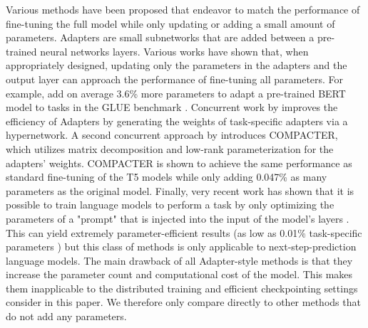Various methods have been proposed that endeavor to match the performance of fine-tuning the full model while only updating or adding a small amount of parameters. Adapters \citep{DBLP:journals/corr/abs-1902-00751,rebuffi2017learning,bapna2019simple} are small subnetworks that are added between a pre-trained neural networks layers. Various works \citep{DBLP:journals/corr/abs-1902-00751,mahabadi2021parameterefficient,mahabadi2021compacter} have shown that, when appropriately designed, updating only the parameters in the adapters and the output layer can approach the performance of fine-tuning all parameters. For example, \citet{DBLP:journals/corr/abs-1902-00751} add on average 3.6\% more parameters to adapt a pre-trained BERT model \cite{devlin-etal-2019-bert} to tasks in the GLUE benchmark \cite{wang-glue-2018}. Concurrent work by \citet{mahabadi2021parameterefficient} improves the efficiency of Adapters by generating the weights of task-specific adapters via a hypernetwork. A second concurrent approach by \citet{mahabadi2021compacter} introduces COMPACTER, which utilizes matrix decomposition and low-rank parameterization for the adapters' weights. COMPACTER is shown to achieve the same performance as standard fine-tuning of the T5 models \cite{raffel2020exploring} while only adding 0.047\% as many parameters as the original model. Finally, very recent work has shown that it is possible to train language models to perform a task by only optimizing the parameters of a "prompt" that is injected into the input of the model's layers \cite{li2021prefix,lester2021power}. This can yield extremely parameter-efficient results (as low as 0.01\% task-specific parameters \cite{lester2021power}) but this class of methods is only applicable to next-step-prediction language models. The main drawback of all Adapter-style methods is that they increase the parameter count and computational cost of the model. This makes them inapplicable to the distributed training and efficient checkpointing settings consider in this paper. We therefore only compare directly to other methods that do not add any parameters.

